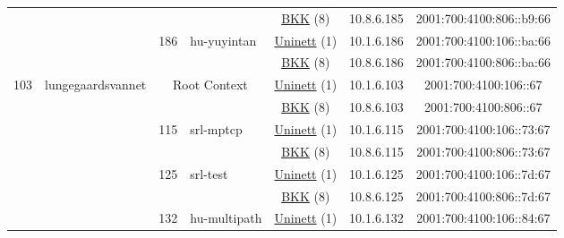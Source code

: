 \begin{small}
\begin{center}
\begin{longtable}{|c|c|c|c|c|c|c|c|}
  &  &  &  & \multicolumn{2}{|c|}{\tiny{\href{http://bkk.no}{BKK} (8)}} & \tiny{10.8.6.185} & \tiny{2001:700:4100:806::b9:66} \\* \cline{3-3}\cline{4-4}\cline{5-5}\cline{6-6}\cline{7-7}\cline{8-8}
  &  & \multirow{2}{*}{\tiny{186}} & \multicolumn{1}{|l|}{\multirow{2}{*}{\tiny{hu-yuyintan}}} & \multicolumn{2}{|c|}{\tiny{\href{https://www.uninett.no}{Uninett} (1)}} & \tiny{10.1.6.186} & \tiny{2001:700:4100:106::ba:66} \\* \cline{5-5}\cline{6-6}\cline{7-7}\cline{8-8}
  &  &  &  & \multicolumn{2}{|c|}{\tiny{\href{http://bkk.no}{BKK} (8)}} & \tiny{10.8.6.186} & \tiny{2001:700:4100:806::ba:66} \\ \hline
 \multirow{26}{*}{\tiny{103}} & \multicolumn{1}{|l|}{\multirow{26}{*}{\tiny{lungegaardsvannet}}} & \multicolumn{2}{|c|}{\multirow{2}{*}{\tiny{Root Context}}} & \multicolumn{2}{|c|}{\tiny{\href{https://www.uninett.no}{Uninett} (1)}} & \tiny{10.1.6.103} & \tiny{2001:700:4100:106::67} \\* \cline{5-5}\cline{6-6}\cline{7-7}\cline{8-8}
  &  & \multicolumn{2}{|c|}{} & \multicolumn{2}{|c|}{\tiny{\href{http://bkk.no}{BKK} (8)}} & \tiny{10.8.6.103} & \tiny{2001:700:4100:806::67} \\* \cline{3-3}\cline{4-4}\cline{5-5}\cline{6-6}\cline{7-7}\cline{8-8}
  &  & \multirow{2}{*}{\tiny{115}} & \multicolumn{1}{|l|}{\multirow{2}{*}{\tiny{srl-mptcp}}} & \multicolumn{2}{|c|}{\tiny{\href{https://www.uninett.no}{Uninett} (1)}} & \tiny{10.1.6.115} & \tiny{2001:700:4100:106::73:67} \\* \cline{5-5}\cline{6-6}\cline{7-7}\cline{8-8}
  &  &  &  & \multicolumn{2}{|c|}{\tiny{\href{http://bkk.no}{BKK} (8)}} & \tiny{10.8.6.115} & \tiny{2001:700:4100:806::73:67} \\* \cline{3-3}\cline{4-4}\cline{5-5}\cline{6-6}\cline{7-7}\cline{8-8}
  &  & \multirow{2}{*}{\tiny{125}} & \multicolumn{1}{|l|}{\multirow{2}{*}{\tiny{srl-test}}} & \multicolumn{2}{|c|}{\tiny{\href{https://www.uninett.no}{Uninett} (1)}} & \tiny{10.1.6.125} & \tiny{2001:700:4100:106::7d:67} \\* \cline{5-5}\cline{6-6}\cline{7-7}\cline{8-8}
  &  &  &  & \multicolumn{2}{|c|}{\tiny{\href{http://bkk.no}{BKK} (8)}} & \tiny{10.8.6.125} & \tiny{2001:700:4100:806::7d:67} \\* \cline{3-3}\cline{4-4}\cline{5-5}\cline{6-6}\cline{7-7}\cline{8-8}
  &  & \multirow{2}{*}{\tiny{132}} & \multicolumn{1}{|l|}{\multirow{2}{*}{\tiny{hu-multipath}}} & \multicolumn{2}{|c|}{\tiny{\href{https://www.uninett.no}{Uninett} (1)}} & \tiny{10.1.6.132} & \tiny{2001:700:4100:106::84:67} \\* \cline{5-5}\cline{6-6}\cline{7-7}\cline{8-8}

\end{longtable}
\end{center}
\end{small}
